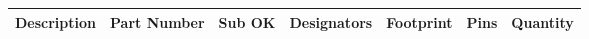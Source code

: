\documentclass{article}
\begin{document}


\begin{center}
    \begin{longtable}{|p{4.7cm} | p{3.8cm} | l | p{3.8cm} | l | r | r |}
    \hline
	{\textbf{Description}} & \multicolumn{1}{l|}{\textbf{Part Number}} & \multicolumn{1}{l|}{\textbf{Sub OK}} & \multicolumn{1}{l|}{\textbf{Designators}} & \multicolumn{1}{l|}{\textbf{Footprint}} & \multicolumn{1}{r|}{\textbf{Pins}} & \multicolumn{1}{r|}{\textbf{Quantity}} \\ \hline	 
	\endhead
	
    \end{longtable}
\end{center}

\end{document}
